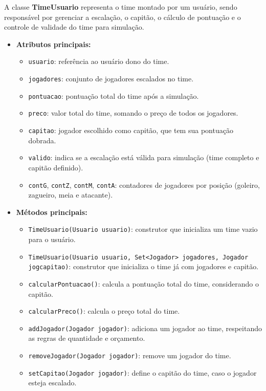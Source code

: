 \documentclass[12pt]{article}
\begin{document}
A classe \textbf{TimeUsuario} representa o time montado por um usuário, sendo responsável por gerenciar a escalação, o capitão, o cálculo de pontuação e o controle de validade do time para simulação.

\begin{itemize}
  \item \textbf{Atributos principais:}
        \begin{itemize}
          \item \texttt{usuario}: referência ao usuário dono do time.
          \item \texttt{jogadores}: conjunto de jogadores escalados no time.
          \item \texttt{pontuacao}: pontuação total do time após a simulação.
          \item \texttt{preco}: valor total do time, somando o preço de todos os jogadores.
          \item \texttt{capitao}: jogador escolhido como capitão, que tem sua pontuação dobrada.
          \item \texttt{valido}: indica se a escalação está válida para simulação (time completo e capitão definido).
          \item \texttt{contG}, \texttt{contZ}, \texttt{contM}, \texttt{contA}: contadores de jogadores por posição (goleiro, zagueiro, meia e atacante).
        \end{itemize}
  \item \textbf{Métodos principais:}
        \begin{itemize}
          \item \texttt{TimeUsuario(Usuario usuario)}: construtor que inicializa um time vazio para o usuário.
          \item \texttt{TimeUsuario(Usuario usuario, Set<Jogador> jogadores, Jogador jogcapitao)}: construtor que inicializa o time já com jogadores e capitão.
          \item \texttt{calcularPontuacao()}: calcula a pontuação total do time, considerando o capitão.
          \item \texttt{calcularPreco()}: calcula o preço total do time.
          \item \texttt{addJogador(Jogador jogador)}: adiciona um jogador ao time, respeitando as regras de quantidade e orçamento.
          \item \texttt{removeJogador(Jogador jogador)}: remove um jogador do time.
          \item \texttt{setCapitao(Jogador jogador)}: define o capitão do time, caso o jogador esteja escalado.

\end{itemize}
\end{itemize}
\end{document}
